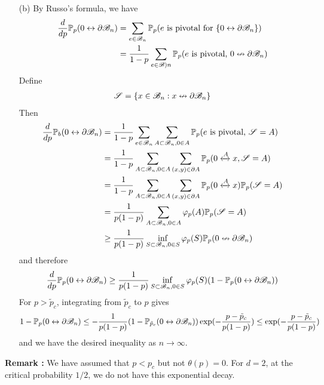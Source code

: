 \documentclass[10pt,a4paper]{report}
\newenvironment{proof}
{\begin{changemargin}{1cm}{0.5cm} 
	}%
	{\end{changemargin}
}
\begin{document}
\begin{proof}
\begin{itemize}
\item[(b)] By Russo's formula, we have
\begin{align*}
\frac{d}{dp}\mathbb{P}_p(0\leftrightarrow \partial \mathscr{B}_n) &= \sum_{e\in \mathscr{B}_n}\mathbb{P}_p(e \text{ is pivotal for } \{0\leftrightarrow \partial \mathscr{B}_n \}) \\
&= \frac{1}{1-p}\sum_{e\in \mathscr{B})n} \mathbb{P}_p (e \text{ is pivotal, }0\nleftrightarrow \partial \mathscr{B}_n)
\end{align*}
Define
\begin{align*}
\mathscr{S} = \{ x\in \mathscr{B}_n : x\nleftrightarrow \partial \mathscr{B}_n \}
\end{align*}
Then
\begin{align*}
\frac{d}{dp}\mathbb{P}_b(0\leftrightarrow \partial \mathscr{B}_n) &= \frac{1}{1-p} \sum_{e\in \mathscr{B}_n} \sum_{A \subset \mathscr{B}_n,0\in A} \mathbb{P}_{p}(e \text{ is pivotal, }\mathscr{S}=A) \\
&= \frac{1}{1-p} \sum_{A\subset \mathscr{B}_n,0 \in A} \sum_{(x,y)\in \partial A}  \mathbb{P}_p(0\xleftrightarrow{A} x,\mathscr{S}=A) \\
&= \frac{1}{1-p} \sum_{A\subset \mathscr{B}_n,0 \in A} \sum_{(x,y)\in \partial A} \mathbb{P}_p(0\xleftrightarrow{A} x)\mathbb{P}_p(\mathscr{S}=A)  \\
&= \frac{1}{p(1-p)} \sum_{A\subset \mathscr{B}_n,0\in A} \varphi_p(A) \mathbb{P}_p(\mathscr{S}=A) \\
& \geq \frac{1}{p(1-p)} \inf_{S\subset \mathscr{B}_n,0\in S} \varphi_p(S) \mathbb{P}_p(0\nleftrightarrow \partial \mathscr{B}_n)
\end{align*}
and therefore
\begin{align*}
\frac{d}{dp}\mathbb{P}_p(0\leftrightarrow \partial \mathscr{B}_n) \geq \frac{1}{p(1-p)} \inf_{S\subset \mathscr{B}_n,0\in S} \varphi_p(S)(1-\mathbb{P}_p(0\leftrightarrow \partial \mathscr{B}_n))
\end{align*}
For $p>\tilde{p}_c$, integrating from $\tilde{p}_c$ to $p$ gives
\begin{align*}
1-\mathbb{P}_p(0\leftrightarrow \partial \mathscr{B}_n) \leq -\frac{1}{p(1-p)}(1-\mathbb{P}_{\tilde{p}_c}(0\leftrightarrow \partial \mathscr{B}_n)) \exp(-\frac{p-\tilde{p}_c}{p(1-p)}) \leq \exp(-\frac{p-\tilde{p}_c}{p(1-p)})
\end{align*}
and we have the desired inequality as $n\rightarrow \infty$.
\end{itemize}
\end{proof}
\s

\bull \textbf{Remark :} We have assumed that $p<p_c$ but not $\theta(p) = 0$. For $d=2$, at the critical probability $1/2$, we do not have this exponential decay.
\s
\end{document}
